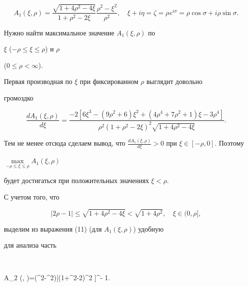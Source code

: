 \begin{equation}


A_1 ({\xi,\rho} )=


\frac{{\sqrt {1+4\rho^2-4\xi}}}{{1+\rho^2-2\xi}}\frac{{\rho 


^2-\xi^2}}{{\rho^2}},\quad


\xi+i\eta=\zeta=\rho^{}e^{i\sigma}=\rho \cos\sigma+i\rho \sin\sigma. 


\end{equation}


Нужно найти максимальное значение $A_1 ({\xi,\rho})$ по 


$\xi$ ($- \rho \le \xi \le \rho$) и $\rho$


($0 \le \rho < \infty$).





Первая производная по $\xi $ при фиксированном $\rho $ выглядит довольно 


громоздко


$$


\frac{{dA_1 ({\xi,\rho} )}}{{d\xi}}=


\frac{{- 2[{6\xi^{3}-({9\rho^2+6})\xi^2+


({4\rho^{4}+7\rho^2+1})\xi-3\rho^{4}} 


]}}{{\rho^2({1+\rho^2-2\xi} )^2\sqrt {1+4\rho^2-4\xi}}}.


$$


Тем не менее отсюда сделаем вывод, что $\frac{{dA_1 ({\xi,\rho} 


)}}{{d\xi}} > 0$ при $\xi \in [{- \rho,0} ]$. Поэтому 


$\max\limits_{- \rho \le \xi \le \rho} A_1 ({\xi,\rho})$


будет достигаться при положительных значениях $\xi < \rho $.


С учетом того, что


\begin{equation}


|2\rho-1| \le \sqrt {1+4\rho^2-4\xi} < 


\sqrt {1+4\rho^2},\quad \xi \in ({0,\rho} ],


\end{equation}


выделим из выражения (11) (для $A_1 ({\xi,\rho} )$) удобную 


для анализа часть


$$


A_2 ({\xi,\rho} )=({\rho^2-\xi^2})[{({1+\rho^2-2\xi})\rho^2} ]^{- 1}.


